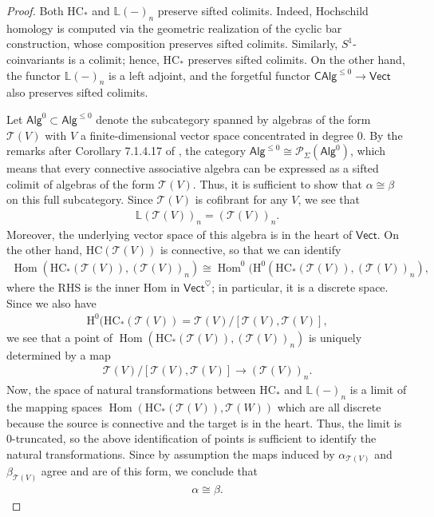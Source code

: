 \documentclass{article}
\numberwithin{equation}{section}
\theoremstyle{quest}
\theoremstyle{definition}
\theoremstyle{remark}
\DeclareMathOperator{\Hom}{Hom}
\begin{document}
\begin{proof}
	Both $\mathrm{HC}_*$ and $\mathbb{L}(-)_n$ preserve sifted colimits. Indeed, Hochschild homology is computed via the geometric realization of the cyclic bar construction, whose composition preserves sifted colimits. Similarly, $S^1$-coinvariants is a colimit; hence, $\mathrm {HC}_*$ preserves sifted colimits. On the other hand, the functor $\mathbb{L}(-)_n$ is a left adjoint, and the forgetful functor $\mathsf{CAlg}^{\le 0}\to \mathsf{Vect}$ also preserves sifted colimits.

	Let $\mathsf{Alg}^{0}\subset \mathsf{Alg}^{\le 0}$ denote the subcategory spanned by algebras of the form $\mathscr{T}(V)$ with $V$ a finite-dimensional vector space concentrated in degree 0. By the remarks after Corollary 7.1.4.17 of \cite{HA}, the category $\mathsf{Alg}^{\le 0}\cong \mathscr{P}_\Sigma(\mathsf{Alg}^0)$, which means that every connective associative algebra can be expressed as a sifted colimit of algebras of the form $\mathscr{T}(V)$. Thus, it is sufficient to show that $\alpha\cong\beta$ on this full subcategory. Since $\mathscr{T}(V)$ is cofibrant for any $V$, we see that
	\begin{align*}
		\mathbb{L}(\mathscr{T}(V))_n=(\mathscr{T}(V))_n.
	\end{align*} 
	Moreover, the underlying vector space of this algebra is in the heart of $\mathsf{Vect}$. On the other hand, $\mathrm{HC}(\mathscr{T}(V))$ is connective, so that we can identify
	\begin{align*}
		\Hom(\mathrm{HC}_*(\mathscr{T}(V)),(\mathscr{T}(V))_n)\cong \Hom^0(\mathrm H^0(\mathrm{HC}_*(\mathscr{T}(V)),(\mathscr{T}(V))_n),
	\end{align*} 
	where the RHS is the inner Hom in $\mathsf{Vect}^{\heartsuit}$; in particular, it is a discrete space. Since we also have
	\begin{align*}
		\mathrm H^0(\mathrm{HC}_*(\mathscr{T}(V))=\mathscr{T}(V) /[\mathscr{T}(V),\mathscr{T}(V)],
	\end{align*} 
	we see that a point of $\Hom(\mathrm{HC}_*(\mathscr{T}(V)), (\mathscr{T}(V))_n)$ is uniquely determined by a map
	\begin{align*}
		\mathscr{T}(V) /[\mathscr{T}(V),\mathscr{T}(V)]\to (\mathscr{T}(V))_n.	
	\end{align*} 
	Now, the space of natural transformations between $\mathrm{HC}_*$ and $\mathbb{L}(-)_n$ is a limit of the mapping spaces $\Hom(\mathrm{HC}_*(\mathscr{T}(V)),\mathscr{T}(W))$ which are all discrete because the source is connective and the target is in the heart. Thus, the limit is 0-truncated, so the above identification of points is sufficient to identify the natural transformations. Since by assumption the maps induced by $\alpha_{\mathscr{T}(V)}$ and $\beta_{\mathscr{T}(V)}$ agree and are of this form, we conclude that
	\begin{align*}
		\alpha\cong\beta.
	\end{align*} 
\end{proof} 
\end{document}
